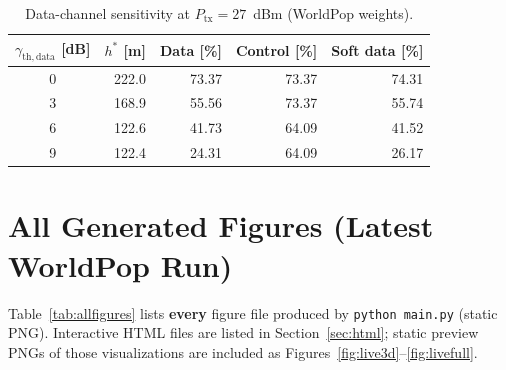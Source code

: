 \documentclass[11pt,a4paper]{article}
\begin{document}
\begin{table}[H]
\centering
\caption{Data-channel sensitivity at $P_{\mathrm{tx}}=27$~dBm (WorldPop weights).}
\label{tab:sensitivity_data}
\begin{tabular}{crrrr}
\toprule
$\gamma_{\mathrm{th,data}}$ [dB] & $h^\ast$ [m] & Data [\%] & Control [\%] & Soft data [\%] \\
\midrule
0 & 222.0 & 73.37 & 73.37 & 74.31 \\
3 & 168.9 & 55.56 & 73.37 & 55.74 \\
6 & 122.6 & 41.73 & 64.09 & 41.52 \\
9 & 122.4 & 24.31 & 64.09 & 26.17 \\
\bottomrule
\end{tabular}
\end{table}

\section{All Generated Figures (Latest WorldPop Run)}

Table~\ref{tab:allfigures} lists \textbf{every} figure file produced by
\texttt{python main.py} (static PNG). Interactive HTML files are listed in
Section~\ref{sec:html}; static preview PNGs of those visualizations are included
as Figures~\ref{fig:live3d}--\ref{fig:livefull}.
\end{document}
